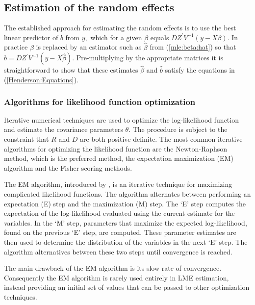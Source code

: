 \documentclass[12pt, a4paper]{report}
\theoremstyle{plain}
\theoremstyle{definition}
\theoremstyle{remark}
\begin{document}

\subsection{Estimation of the random effects}

The established approach for estimating the random effects is to use the best linear predictor of $b$ from $y,$ which for a given $\beta$ equals $DZ^\prime V^{-1}(y - X \beta).$ In practice $\beta$ is replaced by an estimator such as $\hat{\beta}$ from (\ref{mle:beta:hat}) so that $\hat{b} = DZ^\prime V^{-1}(y - X \hat{\beta}).$ Pre-multiplying by the appropriate matrices it is straightforward to show that these estimates $\hat{\beta}$ and $\hat{b}$ satisfy the equations in (\ref{Henderson:Equations}).

\subsubsection{Algorithms for likelihood function optimization}Iterative numerical techniques are used to optimize the log-likelihood function and estimate the covariance parameters $\theta$. The procedure is subject to the constraint that $R$ and $D$ are both positive definite. The most common iterative algorithms for optimizing the likelihood function are the Newton-Raphson method, which is the preferred method, the expectation maximization (EM) algorithm and the Fisher scoring methods.

The EM algorithm, introduced by \citet{EM}, is an iterative technique for maximizing complicated likelihood functions. The algorithm alternates between performing an expectation (E) step
and the maximization (M) step. The `E' step computes the expectation of the log-likelihood evaluated using the current
estimate for the variables. In the `M' step, parameters that maximize the expected log-likelihood, found on the previous `E' step, are computed. These parameter estimates are then used to determine the distribution of the variables in the next `E' step. The algorithm alternatives between these two steps until convergence is reached.

The main drawback of the EM algorithm is its slow rate of
convergence. Consequently the EM algorithm is rarely used entirely in LME estimation,
instead providing an initial set of values that can be passed to
other optimization techniques.
\end{document}
